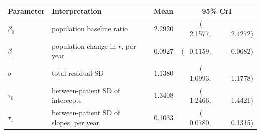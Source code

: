\begin{tabular}{@{}llr@{\hskip 10pt}r@{\,}c@{\,}r@{}}
\toprule
Parameter & Interpretation & Mean & \multicolumn{3}{c}{95\% CrI} \\
\midrule
$\beta_0$ & population baseline ratio              & 2.2920  & ($\phantom{-}$2.1577, & & $\phantom{-}$2.4272) \\
$\beta_1$ & population change in $r$, per year     & $-0.0927$ & ($-0.1159$, & & $-0.0682$) \\
$\sigma$  & total residual SD                      & 1.1380  & ($\phantom{-}$1.0993, & & $\phantom{-}$1.1778) \\
$\tau_0$  & between-patient SD of intercepts       & 1.3408  & ($\phantom{-}$1.2466, & & $\phantom{-}$1.4421) \\
$\tau_1$  & between-patient SD of slopes, per year & 0.1033  & ($\phantom{-}$0.0780, & & $\phantom{-}$0.1315) \\
\bottomrule
\end{tabular}
